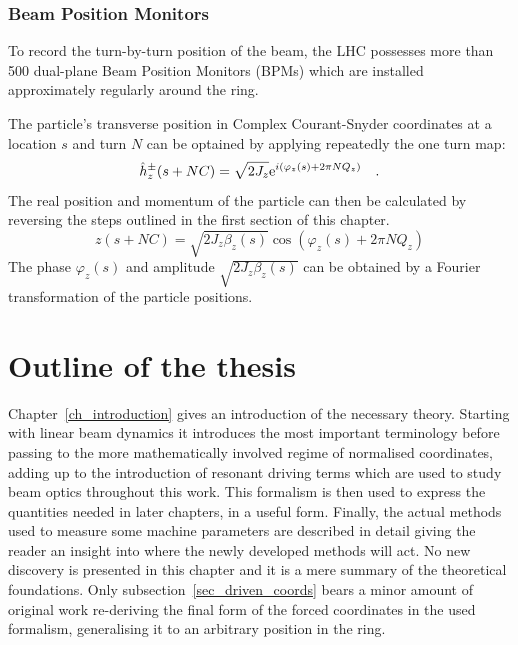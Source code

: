 
\subsubsection{Beam Position Monitors}

To record the turn-by-turn position of the beam, the LHC possesses more than 500 dual-plane
Beam Position Monitors (BPMs) which are installed approximately regularly around the ring. 

The particle's transverse position in Complex Courant-Snyder coordinates at a location $s$ and turn
$N$ can be optained by applying repeatedly the one turn map:
%
\begin{equation}
    \hat{h}_z^\pm(s + NC) = \sqrt{2J_z} \text{e}^{i \left( \varphi_z(s) + 2\pi N Q_z\right)} 
    \quad .
\end{equation}
%
The real position and momentum of the particle can then be calculated by reversing the steps outlined
in the first section of this chapter.
%
\begin{equation}
    z(s + NC) = \sqrt{2J_z\beta_z(s)}\cos \left( \varphi_z(s) + 2\pi N Q_z\right)
\end{equation}
%
The phase $\varphi_z(s)$ and amplitude $\sqrt{2J_z\beta_z(s)}$ can be obtained by a Fourier transformation of
the particle positions.

\section{Outline of the thesis}

Chapter~\ref{ch_introduction} gives an introduction of the necessary theory. Starting with linear beam 
dynamics it introduces the most important terminology before passing to the more mathematically involved
regime of normalised coordinates, adding up to the introduction of resonant driving terms which are used
to study beam optics throughout this work.
This formalism is then used to express the quantities needed in later chapters, in a useful form. 
Finally, the actual methods used to measure some machine parameters are described in detail giving the
reader an insight into where the newly developed methods will act.
No new discovery is presented in this chapter and it is a mere summary of the theoretical foundations.
Only subsection~\ref{sec_driven_coords} bears a minor amount of original work re-deriving the final form
of the forced coordinates in the used formalism, generalising it to an arbitrary position in the ring.

